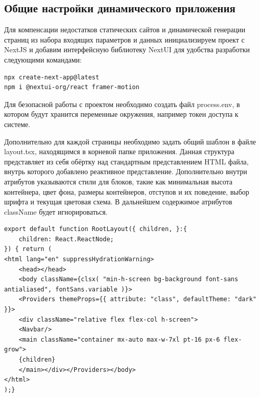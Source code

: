\documentclass[master, och, pract]{SCWorks}
\begin{document}
\subsection{Общие настройки динамического приложения}
Для компенсации недостатков статических сайтов и динамической генерации страниц из набора входящих параметров и данных инициализируем проект с NextJS и добавим интерфейсную библиотеку NextUI для удобства разработки следующими командами:
\begin{verbatim}
npx create-next-app@latest
npm i @nextui-org/react framer-motion
\end{verbatim}

Для безопасной работы с проектом необходимо создать файл process.env, в котором будут хранится переменные окружения, например токен доступа к системе.

Дополнительно для каждой страницы необходимо задать общий шаблон в файле layout.tsx, находящимся в корневой папке приложения. Данная структура представляет из себя обёртку над стандартным представлением HTML файла, внутрь которого добавлено реактивное представление. Дополнительно внутри атрибутов указываются стили для блоков, такие как минимальная высота контейнера, цвет фона, размеры контейнеров, отступов и их поведение, выбор шрифта и текущая цветовая схема. В дальнейшем содержимое атрибутов className будет  игнорироваться. 
\begin{verbatim}
export default function RootLayout({ children, }:{
	children: React.ReactNode;
}) { return (
<html lang="en" suppressHydrationWarning>  
    <head></head>
    <body className={clsx( "min-h-screen bg-background font-sans antialiased", fontSans.variable )}>
    <Providers themeProps={{ attribute: "class", defaultTheme: "dark" }}>
    <div className="relative flex flex-col h-screen">
    <Navbar/>
    <main className="container mx-auto max-w-7xl pt-16 px-6 flex-grow">
    {children}
    </main></div></Providers></body>
</html>
);}
\end{verbatim}
\end{document}
